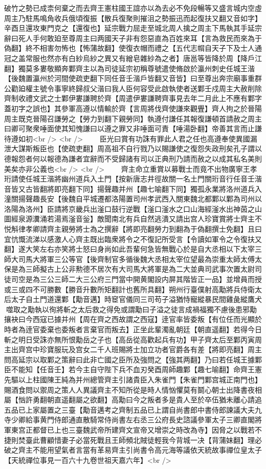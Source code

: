 破竹之勢已成柰何棄之而去齊王憲柱國王誼亦以為去必不免段暢等又盛言城内空虛周主乃駐馬鳴角收兵俄頃復振【散兵復聚則摧沮之勢振迅而起復扶又翻又音如字】辛酉旦還攻東門克之【還復也】延宗戰力屈走至城北周人擒之周主下馬執其手延宗辭曰死人手何敢廹至尊周主曰两國天子非有怨惡直為百姓來耳【言為救民而來為于偽翻】終不相害勿怖也【怖蒲故翻】使復衣帽而禮之【五代志㡌自天子下及士人通冠之盖常服也然亦有白紗烏紗之異又有繒皂雜紗為之者】唐邕等皆降於周【降戶江翻】獨莫多婁敬顯奔鄴齊主以為司徒延宗初稱尊號遣使脩啟於瀛州刺史任城王湝【後魏置瀛州於河間使疏吏翻下同任音壬湝戶皆翻又音皆】曰至尊出奔宗廟事重群公勸廹權主號令事寧終歸叔父湝曰我人臣何容受此啟執使者送鄴壬戍周主大赦削除齊制收禮文武之士鄴伊婁謙聘於齊【周遣伊婁謙聘齊事見去年二月此上不應有鄴字蓋初字之誤也】其參軍高遵以情輸於齊【言周將伐齊使謙來觀舋】齊人拘之於晉陽周主既克晉陽召謙勞之【勞力到翻下親勞同】執遵付謙任其報復謙頓首請赦之周主曰卿可聚衆唾面使其知愧謙曰以遵之罪又非唾面可責【唾湯卧翻】帝善其言而止謙待遵如初<br />
<br />
　　臣光曰賞有功誅有罪此人君之任也高遵奉使異國漏泄大謀斯叛臣也【使疏吏翻】周高祖不自行戮乃以賜謙使之復怨失政刑矣孔子謂以德報怨者何以報德為謙者宜辭而不受歸諸有司以正典刑乃請而赦之以成其私名美則美矣亦非公義也<br />
<br />
　　齊主命立重賞以募戰士而竟不出物廣寧王孝珩請使任城王湝將幽州道兵入土門【按新唐志井徑故關一名土門關珩音行任音壬湝音皆又古皆翻將即亮翻下同】揚聲趣并州【趣七喻翻下同】獨孤永業將洛州道兵入潼關揚聲趣長安【後魏自平城遷都洛陽置司州孝武西入關東魏北都鄴以鄴為司州以洛陽為洛州】臣請將京畿兵出滏口鼓行逆戰【滏口滏水之口山海經滏水出神茵之山圖經泉源瀵涌若湯焉滏音釡】敵聞南北有兵自然逃潰又請出宫人珍寶賞將士齊主不悦斛律孝卿請齊主親勞將士為之撰辭【將即亮翻勞力到翻為于偽翻撰士免翻】且曰宜忼慨流涕以感激人心齊主既出臨衆將令之不復記所受言【令讀如軍令之令復扶又翻】遂大笑左右亦笑將士怒曰身尚如此吾輩何急皆無戰心於是自大丞相以下太宰三師大司馬大將軍三公等官【後齊制官多循後魏大丞相太宰位望最為崇重太師太傅太保是為三師擬古上公非勲德不居次有大司馬大將軍是為二大並典司武事次置太尉司徒司空是為三公三師二大三公府三門當中開黄閣設内屏其階皆正一品】並增員而授或三或四不可勝數【勝音升數所矩翻計也舊所具翻】朔州行臺僕射高勱將兵侍衛太后太子自土門道還鄴【勱音邁】時䆠官儀同三司苟子溢猶恃寵縱暴民間雞彘縱鷹犬噬取之勱執以徇將斬之太后救之得免或謂勱曰子溢之徒言成禍福獨不慮後患邪勱攘袂曰今西寇已據并州【周在齊之西故謂之西寇】逹官率皆委叛【有位任而光顯於時者為逹官委棄也委叛者言棄官而叛去】正坐此輩濁亂朝廷【朝直遥翻】若得今日斬之明日受誅亦無所恨勱岳之子也【高岳從高歡起兵有功】甲子齊太后至鄴丙寅周主出齊宫中珍寶服玩及宫女二千人班賜將士加立功者官爵各有差【將即亮翻】周主問高延宗以取鄴之策辭曰此非亡國之臣所及強問之【強其两翻】乃曰若任城王據鄴臣不能知【任音壬】若今主自守陛下兵不血刃癸酉周師趣鄴【趣七喻翻】命齊王憲先驅以上柱國陳王純為并州總管齊主引諸貴臣入朱雀門【朱雀門鄴宫城正南門也】賜酒食問以禦周之策人人異議齊主不知所從是時人情忷懼莫有鬬心朝士出降書夜相屬【忷許勇翻朝直遥翻屬之欲翻】高勱曰今之叛者多是貴人至於卒伍猶未離心請追五品已上家屬置之三臺【勱音邁考之齊制五品已上謂自尚書郎中書侍郎諫議大夫九寺少卿給事黄門侍郎通直散騎常侍尚書左右丞三公府長史諮議參軍太子三卿直閣將軍東宫正都督已上也三臺魏武帝所建齊文宣帝又增崇之時改為寺】因脅之以戰若不捷則焚臺此曹顧惜妻子必當死戰且王師頻北賊徒輕我今背城一决【背蒲妹翻】理必破之齊主不能用望氣者言當有革易齊主引尚書令高元海等議依天統故事禪位皇太子【天統禪位事見一百六十九卷世祖天嘉六年】<br />
